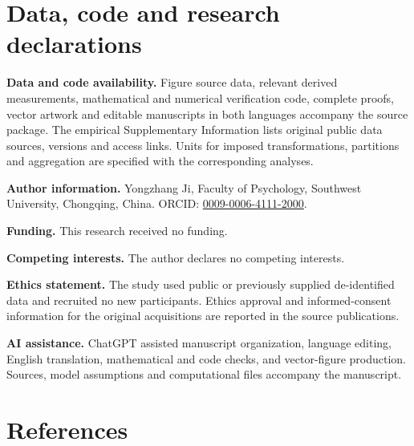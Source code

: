\documentclass[11pt,a4paper]{article}
\begin{document}
\section{Data, code and research
declarations}\label{data-code-and-research-declarations}

\textbf{Data and code availability.} Figure source data, relevant
derived measurements, mathematical and numerical verification code,
complete proofs, vector artwork and editable manuscripts in both
languages accompany the source package. The empirical Supplementary
Information lists original public data sources, versions and access
links. Units for imposed transformations, partitions and aggregation are
specified with the corresponding analyses.

\textbf{Author information.} Yongzhang Ji, Faculty of Psychology,
Southwest University, Chongqing, China. ORCID:
\href{https://orcid.org/0009-0006-4111-2000}{0009-0006-4111-2000}.

\textbf{Funding.} This research received no funding.

\textbf{Competing interests.} The author declares no competing
interests.

\textbf{Ethics statement.} The study used public or previously supplied
de-identified data and recruited no new participants. Ethics approval
and informed-consent information for the original acquisitions are
reported in the source publications.

\textbf{AI assistance.} ChatGPT assisted manuscript organization,
language editing, English translation, mathematical and code checks, and
vector-figure production. Sources, model assumptions and computational
files accompany the manuscript.

\FloatBarrier


\section{References}\label{references}

\fontsize{9}{11}\selectfont
\setlength{\parskip}{2pt}
\end{document}
